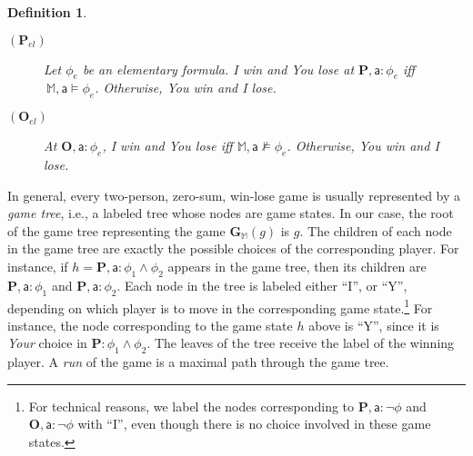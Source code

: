 \documentclass{easychair}
\newcommand{\I}{\emph{I}\xspace}
\newcommand{\You}{\emph{You}\xspace}
\newcommand{\Your}{\emph{Your}\xspace}
\newcommand{\ag}{\mathsf{a}}
\newtheorem{definition}{Definition}
\begin{document}
\begin{definition}
\begin{description}
\item[$(\mathbf{P}_{el})$] Let $\phi_{e}$ be an elementary formula. \I win and \You lose at $\mathbf{P},\ag:\phi_{e}$ iff $~\mathbb{M},\ag \models \phi_{e}$. Otherwise, \You win and \I lose.
\item[$(\mathbf{O}_{el})$] \vspace{-2mm}At $\mathbf{O},\ag : \phi_{e}$, \I win and \You lose iff $\mathbb{M},\ag\not \models \phi_{e}$. Otherwise, \You win and \I lose.
\end{description}
\end{definition}

In general, every two-person, zero-sum, win-lose game is usually represented by
a \emph{game tree}, i.e., a labeled tree whose nodes are game states. In our
case, the root of the game tree representing the game
$\mathbf{G}_\mathbb{M}(g)$ is $g$. The children of each node in the game tree
are exactly the possible choices of the corresponding player. For instance, if
$h=\mathbf{P}, \ag: \phi_1\wedge \phi_2$ appears in the game tree, then its
children are $\mathbf{P},\ag:\phi_1$ and $\mathbf{P},\ag:\phi_2$. Each node in
the tree is labeled either ``I'', or ``Y'', depending on which player is to
move in the corresponding game state.\footnote{For technical reasons, we label
the nodes corresponding to $\mathbf{P}, \ag: \neg \phi$ and $\mathbf{O}, \ag:
\neg \phi$ with ``I'', even though there is no choice involved in these game
states.} For instance, the node corresponding to the game state $h$ above is
``Y'', since it is \Your choice in $\mathbf{P}:\phi_1\wedge \phi_2$. The leaves
of the tree receive the label of the winning player. 
 A \emph{run} of the game is a maximal path through the game tree.
\end{document}
